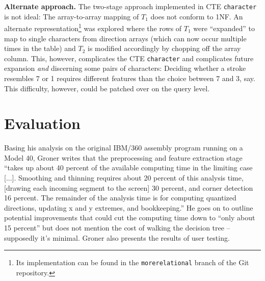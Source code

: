 \documentclass[sigconf]{acmart}
\begin{document}
\textbf{Alternate approach.} The two-stage approach implemented in CTE \texttt{character} is not ideal: The array-to-array mapping of $T_1$ does not conform to 1NF. An alternate representation\footnote{Its implementation can be found in the \texttt{morerelational} branch of the Git repository.} was explored where the rows of $T_1$ were \enquote{expanded} to map to single characters from direction arrays (which can now occur multiple times in the table) and $T_2$ is modified accordingly by chopping off the array column. This, however, complicates the CTE \texttt{character} and complicates future expansion \textit{and} discerning some pairs of characters: Deciding whether a stroke resembles 7 or 1 requires different features than the choice between 7 and 3, say. This difficulty, however, could be patched over on the query level.


\section{Evaluation}

Basing his analysis on the original IBM/360 assembly program running on a Model 40, Groner writes that the preprocessing and feature extraction stage \enquote{takes up about 40 percent of the available computing time in the limiting case [...]. Smoothing and thinning requires about 20 percent of this analysis time, [drawing each incoming segment to the screen] 30 percent, and corner detection 16 percent. The remainder of the analysis time is for computing quantized directions, updating x and y extremes, and bookkeeping.} He goes on to outline potential improvements that could cut the computing time down to \enquote{only about 15 percent} \cite{groner} but does not mention the cost of walking the decision tree – supposedly it's minimal. Groner also presents the results of user testing.
\end{document}
